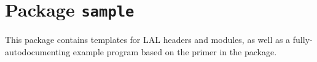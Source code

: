 \chapter{Package \texttt{sample}}

This package contains templates for LAL headers and modules, as well
as a fully-autodocumenting example program based on the primer in the
\verb@std@ package.

\newpage
